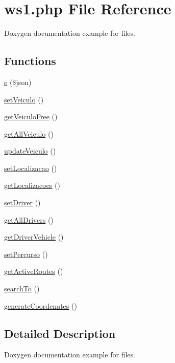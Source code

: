 \hypertarget{ws1_8php}{}\section{ws1.\+php File Reference}
\label{ws1_8php}


Doxygen documentation example for files.  


\subsection*{Functions}
\begin{DoxyCompactItemize}
\item 
\hyperlink{ws1_8php_a3d4bf529575a33154cc2dbdd6d3d776a}{e} (\$json)
\item 
\hyperlink{ws1_8php_a660ff974c7db45259603d9872384001c}{set\+Veiculo} ()
\item 
\hyperlink{ws1_8php_ad20ee002e4ad5a68c635b2fdc8ffd354}{get\+Veiculo\+Free} ()
\item 
\hyperlink{ws1_8php_aff9719dc2fd3e16de9f7b59d30a29f4d}{get\+All\+Veiculo} ()
\item 
\hyperlink{ws1_8php_aff66068ee30d07fe311428175b9a091f}{update\+Veiculo} ()
\item 
\hyperlink{ws1_8php_a70c35e2e6663d5f6332d7650e45bb955}{set\+Localizacao} ()
\item 
\hyperlink{ws1_8php_a15191539176e1d45d462fff112578318}{get\+Localizacoes} ()
\item 
\hyperlink{ws1_8php_a989b83432312277dfb646b607d46f205}{set\+Driver} ()
\item 
\hyperlink{ws1_8php_aec49061f5b7df1eec5e60f461b479703}{get\+All\+Drivers} ()
\item 
\hyperlink{ws1_8php_a18b7b33f22562330013f8b5c503b222f}{get\+Driver\+Vehicle} ()
\item 
\hyperlink{ws1_8php_adb12dd4ecc644dbb39dd9c270d107fd6}{set\+Percurso} ()
\item 
\hyperlink{ws1_8php_ac96bd820eb32f1b05112750160c66475}{get\+Active\+Routes} ()
\item 
\hyperlink{ws1_8php_ad50736ad6f0d84774fb8827f3f87f175}{search\+To} ()
\item 
\hyperlink{ws1_8php_aa856871856632bf9b8009f8d4e7c1f24}{generate\+Coordenates} ()
\end{DoxyCompactItemize}


\subsection{Detailed Description}
Doxygen documentation example for files. 

